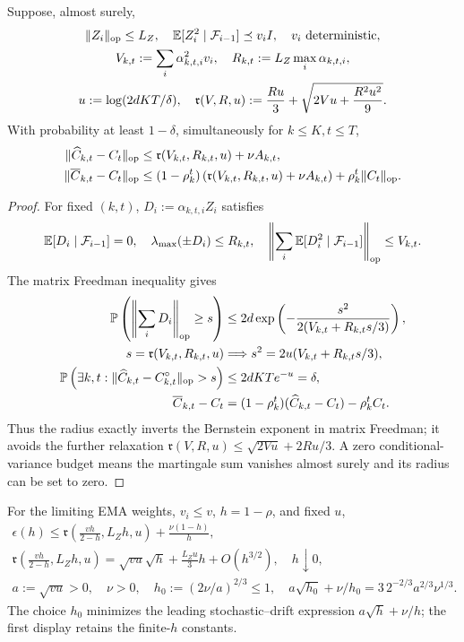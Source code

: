 \begin{theorem}\label{thm:rigid-covariance}
Suppose, almost surely,
\begin{gather}
 \|Z_i\|_{\mathrm{op}}\le L_Z,\quad
 \mathbb E[Z_i^2\mid\mathcal F_{i-1}]\preceq v_i I,
 \quad v_i\text{ deterministic},\\
 V_{k,t}:=\sum_i\alpha_{k,t,i}^2v_i,\quad
 R_{k,t}:=L_Z\max_i\alpha_{k,t,i},\\
 u:=\log(2dKT/\delta),\quad
 \mathfrak r(V,R,u):=\frac{Ru}{3}+\sqrt{2Vu+\frac{R^2u^2}{9}}.
\end{gather}
With probability at least $1-\delta$, simultaneously for $k\le K,t\le T$,
\begin{align}
 \|\widehat C_{k,t}-C_t\|_{\mathrm{op}}
 &\le\mathfrak r(V_{k,t},R_{k,t},u)+\nu A_{k,t},\\
 \|\overline C_{k,t}-C_t\|_{\mathrm{op}}
 &\le(1-\rho_k^t)
  \left(\mathfrak r(V_{k,t},R_{k,t},u)+\nu A_{k,t}\right)
       +\rho_k^t\|C_t\|_{\mathrm{op}}.
\end{align}
\end{theorem}
\begin{proof}
For fixed $(k,t)$, $D_i:=\alpha_{k,t,i}Z_i$ satisfies
\begin{gather}
 \mathbb E[D_i\mid\mathcal F_{i-1}]=0,\quad
 \lambda_{\max}(\pm D_i)\le R_{k,t},\quad
 \left\|\sum_i\mathbb E[D_i^2\mid\mathcal F_{i-1}]\right\|_{\mathrm{op}}\le V_{k,t}.
\end{gather}
The matrix Freedman inequality \citep{tropp2011freedman} gives
\begin{align}
 \mathbb P\left(\left\|\sum_iD_i\right\|_{\mathrm{op}}\ge s\right)
 &\le2d\exp\left(-\frac{s^2}{2(V_{k,t}+R_{k,t}s/3)}\right),\\
 s=\mathfrak r(V_{k,t},R_{k,t},u)
 &\Longrightarrow s^2=2u(V_{k,t}+R_{k,t}s/3),\\
 \mathbb P\left(\exists k,t:\|\widehat C_{k,t}-C^\circ_{k,t}\|_{\mathrm{op}}>s\right)
 &\le2dKT e^{-u}=\delta,\\
 \overline C_{k,t}-C_t
 &=(1-\rho_k^t)(\widehat C_{k,t}-C_t)-\rho_k^t C_t.
\end{align}
Thus the radius exactly inverts the Bernstein exponent in matrix Freedman;
it avoids the further relaxation
$\mathfrak r(V,R,u)\le\sqrt{2Vu}+2Ru/3$. A zero conditional-variance budget
means the martingale sum vanishes almost surely and its radius can be set to zero.
\end{proof}
\begin{corollary}
For the limiting EMA weights, $v_i\le v$, $h=1-\rho$, and fixed $u$,
\begin{gather}
 \epsilon(h)\le\mathfrak r\left(\frac{vh}{2-h},L_Zh,u\right)
                         +\frac{\nu(1-h)}h,\\
 \mathfrak r\left(\frac{vh}{2-h},L_Zh,u\right)
 =\sqrt{vu}\sqrt h+\frac{L_Zu}{3}h+O(h^{3/2}),\quad h\downarrow0,\\
 a:=\sqrt{vu}>0,\quad\nu>0,\quad
 h_0:=(2\nu/a)^{2/3}\le1,\quad
 a\sqrt{h_0}+\nu/h_0=3\,2^{-2/3}a^{2/3}\nu^{1/3}.
\end{gather}
The choice $h_0$ minimizes the leading stochastic--drift expression
$a\sqrt h+\nu/h$; the first display retains the finite-$h$ constants.
\end{corollary}

